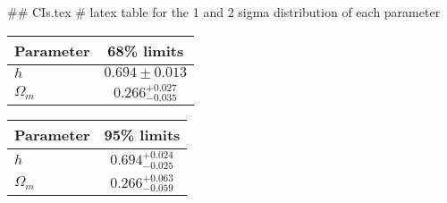 ## CIs.tex
# latex table for the 1 and 2 sigma distribution of each parameter

\begin{tabular} { l  c}
 Parameter &  68\% limits\\
\hline
{\boldmath$h              $} & $0.694\pm 0.013            $\\
{\boldmath$\Omega_m       $} & $0.266^{+0.027}_{-0.035}   $\\
\hline
\end{tabular}

\begin{tabular} { l  c}
 Parameter &  95\% limits\\
\hline
{\boldmath$h              $} & $0.694^{+0.024}_{-0.025}   $\\
{\boldmath$\Omega_m       $} & $0.266^{+0.063}_{-0.059}   $\\
\hline
\end{tabular}
